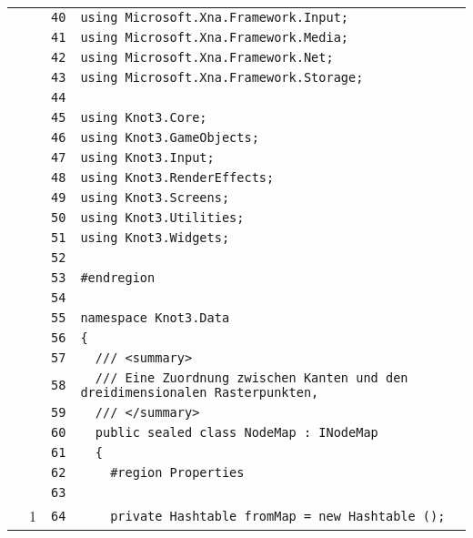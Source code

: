 \documentclass[a4paper,10pt]{article}
\begin{document}
\begin{longtable}[l]{lrrl}
\cellcolor{gray} &  & \verb~40~ & \verb~using Microsoft.Xna.Framework.Input;~\\
\cellcolor{gray} &  & \verb~41~ & \verb~using Microsoft.Xna.Framework.Media;~\\
\cellcolor{gray} &  & \verb~42~ & \verb~using Microsoft.Xna.Framework.Net;~\\
\cellcolor{gray} &  & \verb~43~ & \verb~using Microsoft.Xna.Framework.Storage;~\\
\cellcolor{gray} &  & \verb~44~ & \verb~~\\
\cellcolor{gray} &  & \verb~45~ & \verb~using Knot3.Core;~\\
\cellcolor{gray} &  & \verb~46~ & \verb~using Knot3.GameObjects;~\\
\cellcolor{gray} &  & \verb~47~ & \verb~using Knot3.Input;~\\
\cellcolor{gray} &  & \verb~48~ & \verb~using Knot3.RenderEffects;~\\
\cellcolor{gray} &  & \verb~49~ & \verb~using Knot3.Screens;~\\
\cellcolor{gray} &  & \verb~50~ & \verb~using Knot3.Utilities;~\\
\cellcolor{gray} &  & \verb~51~ & \verb~using Knot3.Widgets;~\\
\cellcolor{gray} &  & \verb~52~ & \verb~~\\
\cellcolor{gray} &  & \verb~53~ & \verb~#endregion~\\
\cellcolor{gray} &  & \verb~54~ & \verb~~\\
\cellcolor{gray} &  & \verb~55~ & \verb~namespace Knot3.Data~\\
\cellcolor{gray} &  & \verb~56~ & \verb~{~\\
\cellcolor{gray} &  & \verb~57~ & \verb~  /// <summary>~\\
\cellcolor{gray} &  & \verb~58~ & \verb~  /// Eine Zuordnung zwischen Kanten und den dreidimensionalen Rasterpunkten, ~\\
\cellcolor{gray} &  & \verb~59~ & \verb~  /// </summary>~\\
\cellcolor{gray} &  & \verb~60~ & \verb~  public sealed class NodeMap : INodeMap~\\
\cellcolor{gray} &  & \verb~61~ & \verb~  {~\\
\cellcolor{gray} &  & \verb~62~ & \verb~    #region Properties~\\
\cellcolor{gray} &  & \verb~63~ & \verb~~\\
\cellcolor{green} & 1 & \verb~64~ & \verb~    private Hashtable fromMap = new Hashtable ();~\\

\end{longtable}
\end{document}
